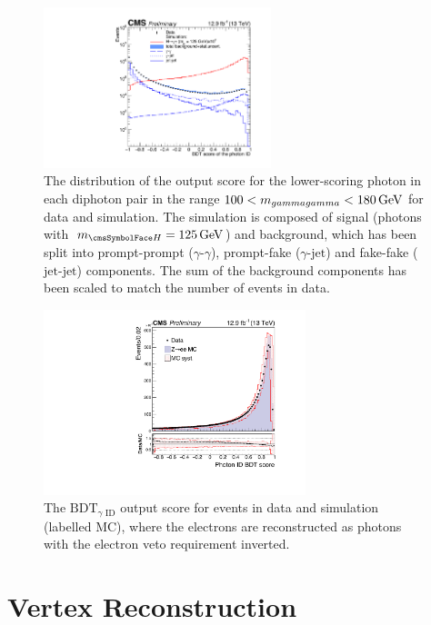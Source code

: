 \begin{figure}[hptb]
\centering \hspace{0.1cm}
\includegraphics[width=0.59\textwidth]{recoFigures/validation_phoID_ICHEP_4sideTicks.pdf}
\caption{
The distribution of the \PhoIdBdt output score for the lower-scoring photon in each diphoton pair in the range $100 < m_{gamma gamma} < 180\,\text{Ge\hspace{-.08em}V}$ for data and simulation. The simulation is composed of signal (\Hgg photons with $\mH=125\GeV$) and background, which has been split into prompt-prompt ($\gamma$-$\gamma$), prompt-fake ($\gamma$-$\textrm{jet}$) and fake-fake ($\textrm{jet}$-$\textrm{jet}$) components. The sum of the background components has been scaled to match the number of events in data.}
\label{fig:reco:photon_id_score_hgg_bkg}
\end{figure}

\begin{figure}[hptb]
\centering 
\includegraphics[width=0.68\textwidth]{recoFigures/idmva_syst_combined.pdf}
\caption{ The $\text{BDT}_{\gamma\text{ ID}}$ output score for \Zee events in data and simulation (labelled MC), where 
the electrons are reconstructed as photons with the electron veto requirement inverted.}
\label{fig:reco:photon_id_zee_validation}
\end{figure}


\section{Vertex Reconstruction}
\label{reco:sec:vertex}


